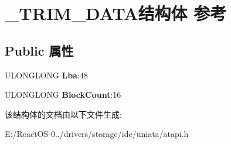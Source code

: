 \hypertarget{struct___t_r_i_m___d_a_t_a}{}\section{\+\_\+\+T\+R\+I\+M\+\_\+\+D\+A\+T\+A结构体 参考}
\label{struct___t_r_i_m___d_a_t_a}
\subsection*{Public 属性}
\begin{DoxyCompactItemize}
\item 
\mbox{\label{struct___t_r_i_m___d_a_t_a_adec8f68119b7b98e79405a46b128099c}} 
U\+L\+O\+N\+G\+L\+O\+NG {\bfseries Lba}\+:48
\item 
\mbox{\label{struct___t_r_i_m___d_a_t_a_ad77d9705aade03984fff78355b5bfd8f}} 
U\+L\+O\+N\+G\+L\+O\+NG {\bfseries Block\+Count}\+:16
\end{DoxyCompactItemize}


该结构体的文档由以下文件生成\+:\begin{DoxyCompactItemize}
\item 
E\+:/\+React\+O\+S-\/0../drivers/storage/ide/uniata/atapi.\+h\end{DoxyCompactItemize}

